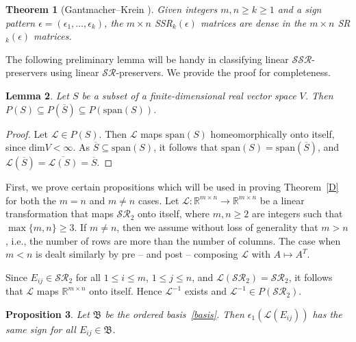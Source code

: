 \documentclass[11pt,reqno]{amsart}
\theoremstyle{plain}
\newtheorem{theorem}{Theorem}[section]
\newtheorem{lemma}[theorem]{Lemma}
\newtheorem{prop}[theorem]{Proposition}
\theoremstyle{definition}
\numberwithin{equation}{section}
\begin{document}
\begin{theorem}[Gantmacher--Krein \cite{GK50}] \label{G-K}
	Given integers $m,n\geq k\geq1$ and a sign pattern $\epsilon=(\epsilon_1,\ldots,\epsilon_k)$, the $m\times n$ SSR$_k(\epsilon)$ matrices are dense in the $m\times n$ SR$_k(\epsilon)$ matrices.
\end{theorem}

The following preliminary lemma will be handy in classifying linear $\mathcal{SSR}$-preservers using linear $\mathcal{SR}$-preservers. We provide the proof for completeness.

\begin{lemma}\cite[Lemma 1]{BHJ85}\label{lemma_preserver}
	Let $S$ be a subset of a finite-dimensional real vector space $V$. Then $P(S)\subseteq P(\overline{S}) \subseteq P(\mathrm{span}(S))$.
\end{lemma}

\begin{proof}
	Let $\mathcal{L}\in P(S)$. Then $\mathcal{L}$ maps $\mathrm{span}(S)$ homeomorphically onto itself, since dim$V<\infty$. As $\overline{S}\subseteq \mathrm{span}(S)$, it follows that $\mathrm{span}(S)=\mathrm{span}(\overline{S})$, and $\mathcal{L}(\overline{S})=\overline{\mathcal{L}(S)}=\overline{S}$.
\end{proof}
First, we prove certain propositions which will be used in proving Theorem~\ref{D} for both the $m=n$ and $m\neq n$ cases. Let $\mathcal{L}:\mathbb{R}^{m\times n}\to\mathbb{R}^{m\times n}$ be a linear transformation that maps $\mathcal{SR}_2$ onto itself, where $m,n\geq 2$ are integers such that $\max\{m,n\}\geq3$. If $m\neq n$, then we assume without loss of generality that $m>n$, i.e., the number of rows are more than the number of columns. The case when $m<n$ is dealt similarly by pre -- and post -- composing $\mathcal{L}$ with $A\mapsto A^T$.

Since $E_{ij}\in \mathcal{SR}_2$ for all $1\leq i\leq m$, $1\leq j\leq n$, and $\mathcal{L}(\mathcal{SR}_2)=\mathcal{SR}_2$, it follows that $\mathcal{L}$ maps $\mathbb{R}^{m\times n}$ onto itself. Hence $\mathcal{L}^{-1}$ exists and $\mathcal{L}^{-1}\in P(\mathcal{SR}_2)$.

\begin{prop}\label{SR_square_image_same_epsilon_1_sign}
	Let $\mathfrak{B}$ be the ordered basis~\eqref{basis}. Then $\epsilon_1(\mathcal{L}(E_{ij}))$ has the same sign for all $E_{ij}\in \mathfrak{B}$.
\end{prop}
\end{document}
